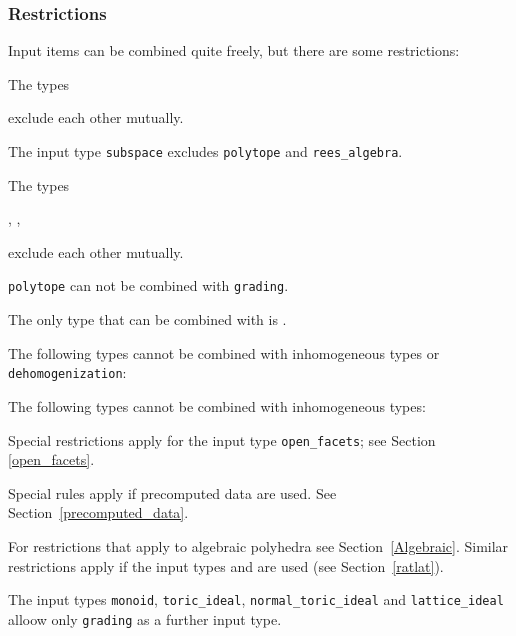 \subsubsection{Restrictions}

Input items can be combined quite freely, but there are some restrictions:

\begin{arab}
	\item The types
	\begin{center}
	\end{center}
	exclude each other mutually.
	\item The input type \verb|subspace| excludes \verb|polytope| and \verb|rees_algebra|.
	\item The types
	\begin{center}
		, , 
	\end{center}
	exclude each other mutually.
	\item \verb|polytope| can not be combined with \verb|grading|.
	\item The only type that can be combined with  is .
	\item The following types cannot be combined with inhomogeneous types or \verb|dehomogenization|:
	\begin{center}
	\end{center}
	\item The following types cannot be combined with inhomogeneous types:
	\begin{center}
	\end{center}
	
	\item Special restrictions apply for the input type \verb|open_facets|; see Section \ref{open_facets}.
	
	\item Special rules apply if precomputed data are used. See Section~\ref{precomputed_data}.
	
	\item For restrictions that apply to algebraic polyhedra see Section~\ref{Algebraic}. Similar restrictions apply if the input types  and  are used (see Section~\ref{ratlat}).
	
	\item The input types \verb|monoid|, \verb|toric_ideal|, \verb|normal_toric_ideal| and \verb|lattice_ideal| alloow only \verb|grading| as a further input type.
\end{arab}

